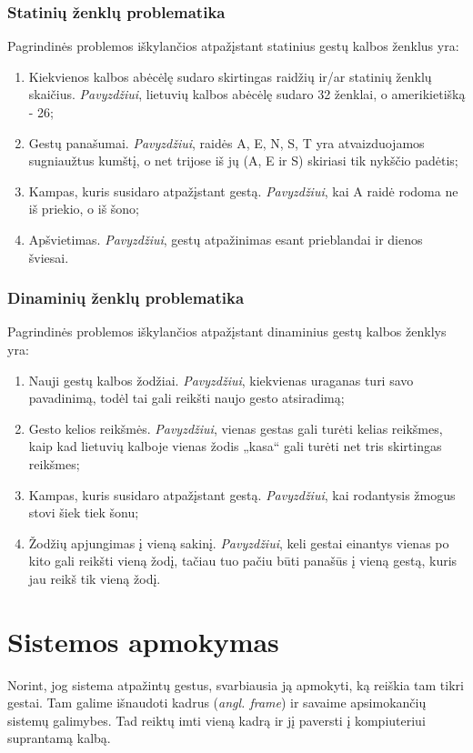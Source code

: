 \documentclass{VUMIFInfKursinis}
\begin{document}
\subsubsection{Statinių ženklų problematika}
Pagrindinės problemos iškylančios atpažįstant statinius gestų kalbos ženklus yra:
\begin{enumerate}
	\item Kiekvienos kalbos abėcėlę sudaro skirtingas raidžių ir/ar statinių ženklų skaičius. \textit{Pavyzdžiui}, lietuvių kalbos abėcėlę sudaro 32 ženklai, o amerikietišką - 26; 
	\item Gestų panašumai. \textit{Pavyzdžiui}, raidės A, E, N, S, T yra atvaizduojamos sugniaužtus kumštį, o net trijose iš jų (A, E ir S) skiriasi tik nykščio padėtis;
	\item Kampas, kuris susidaro atpažįstant gestą. \textit{Pavyzdžiui}, kai A raidė rodoma ne iš priekio, o iš šono;
	\item Apšvietimas. \textit{Pavyzdžiui}, gestų atpažinimas esant prieblandai ir dienos šviesai.
\end{enumerate}
\subsubsection{Dinaminių ženklų problematika}
Pagrindinės problemos iškylančios atpažįstant dinaminius gestų kalbos ženklys yra:
\begin{enumerate}
	\item Nauji gestų kalbos žodžiai. \textit{Pavyzdžiui}, kiekvienas uraganas turi savo pavadinimą, todėl tai gali reikšti naujo gesto atsiradimą; 
	\item Gesto kelios reikšmės. \textit{Pavyzdžiui}, vienas gestas gali turėti kelias reikšmes, kaip kad lietuvių kalboje vienas žodis „kasa“ gali turėti net tris skirtingas reikšmes;
	\item Kampas, kuris susidaro atpažįstant gestą. \textit{Pavyzdžiui}, kai rodantysis žmogus stovi šiek tiek šonu;
	\item Žodžių apjungimas į vieną sakinį. \textit{Pavyzdžiui}, keli gestai einantys vienas po kito gali reikšti vieną žodį, tačiau tuo pačiu būti panašūs į vieną gestą, kuris jau reikš tik vieną žodį.
\end{enumerate}

\section{Sistemos apmokymas}
Norint, jog sistema atpažintų gestus, svarbiausia ją apmokyti, ką reiškia tam tikri gestai. Tam galime išnaudoti kadrus (\textit{angl. frame}) ir savaime apsimokančių sistemų galimybes. Tad reiktų imti vieną kadrą ir jį paversti į kompiuteriui suprantamą kalbą. 
\end{document}
